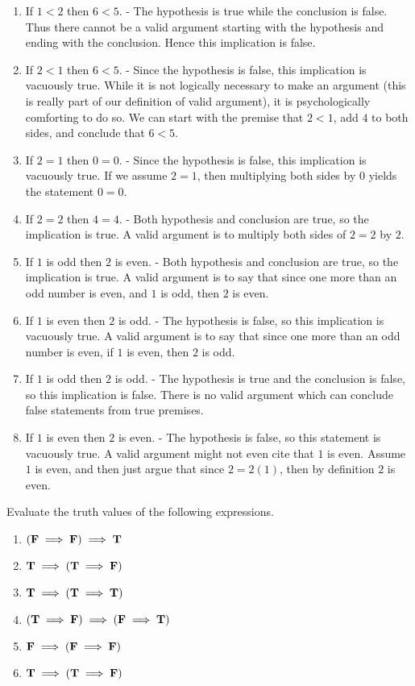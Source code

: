 \begin{solutions}
	\begin{enumerate}
		\item If $1<2$ then $6<5$. - The hypothesis is true while the conclusion is false.  Thus there cannot be a valid argument starting with the hypothesis and ending with the conclusion.  Hence this implication is false.
		\item If $2<1$ then $6<5$.  - Since the hypothesis is false, this implication is vacuously true.  While it is not logically necessary to make an argument (this is really part of our definition of valid argument), it is psychologically comforting to do so.  We can start with the premise that $2<1$, add $4$ to both sides, and conclude that $6<5$.
		\item If $2 = 1$ then $0 = 0$. - Since the hypothesis is false, this implication is vacuously true. If we assume $2 = 1$, then multiplying both sides by $0$ yields the statement $0=0$.
		\item If $2 = 2$ then $4 = 4$. - Both hypothesis and conclusion are true, so the implication is true.  A valid argument is to multiply both sides of $2=2$ by $2$.
		\item If $1$ is odd then $2$ is even.  - Both hypothesis and conclusion are true, so the implication is true.  A valid argument is to say that since one more than an odd number is even, and $1$ is odd, then $2$ is even.
		\item If $1$ is even then $2$ is odd. - The hypothesis is false, so this implication is vacuously true. A valid argument is to say that since one more than an odd number is even, if $1$ is even, then $2$ is odd.
		\item If $1$ is odd then $2$ is odd. - The hypothesis is true and the conclusion is false, so this implication is false.  There is no valid argument which can conclude false statements from true premises.
		\item If $1$ is even then $2$ is even.  - The hypothesis is false, so this statement is vacuously true.  A valid argument might not even cite that $1$ is even.  Assume $1$ is even, and then just argue that since $2 = 2(1)$, then by definition $2$ is even.
	\end{enumerate}
\end{solutions}

\begin{xca}
Evaluate the truth values of the following expressions.
		\begin{enumerate}
			\item $(\textbf{\textrm{F}} \implies \textbf{\textrm{F}}) \implies \textbf{\textrm{T}}$
			\item $\textbf{\textrm{T}} \implies (\textbf{\textrm{T}} \implies \textbf{\textrm{F}})$
			\item $\textbf{\textrm{T}} \implies (\textbf{\textrm{T}} \implies \textbf{\textrm{T}})$
			\item $(\textbf{\textrm{T}} \implies \textbf{\textrm{F}}) \implies (\textbf{\textrm{F}} \implies \textbf{\textrm{T}})$
			\item $\textbf{\textrm{F}} \implies (\textbf{\textrm{F}} \implies \textbf{\textrm{F}})$
			\item $\textbf{\textrm{T}} \implies (\textbf{\textrm{T}} \implies \textbf{\textrm{F}})$
		\end{enumerate}	
\end{xca}

